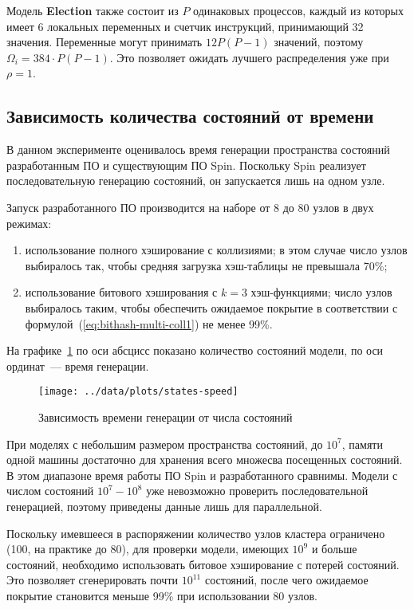 \documentclass[12pt,a4paper,fleqn]{article}
\newcommand{\Code}[1]{\textbf{\mbox{#1}}}
\begin{document}
Модель \Code{Election} также состоит из $P$ одинаковых процессов, каждый из которых имеет 6
локальных переменных и счетчик инструкций, принимающий 32 значения. Переменные могут принимать $12 P
(P-1)$ значений, поэтому $\Omega_i = 384\cdot P (P - 1)$. Это позволяет ожидать лучшего
распределения уже при $\rho = 1$.

\subsection{Зависимость количества состояний от времени}

В данном эксперименте оценивалось время генерации пространства состояний разработанным ПО и
существующим ПО Spin. Поскольку Spin реализует последовательную генерацию состояний, он запускается
лишь на одном узле.

Запуск разработанного ПО производится на наборе от 8 до 80 узлов в двух режимах:
\begin{enumerate}
\item использование полного хэширование с коллизиями; в этом случае число узлов выбиралось
  так, чтобы средняя загрузка хэш-таблицы не превышала 70\%;
\item использование битового хэширования с $k = 3$ хэш-функциями; число узлов выбиралось таким,
  чтобы обеспечить ожидаемое покрытие в соответствии с формулой~(\ref{eq:bithash-multi-coll1}) не
  менее 99\%.
\end{enumerate}

На графике~\ref{fig:states-speed} по оси абсцисс показано количество состояний модели, по
оси ординат~--- время генерации.

\begin{figure}[ht]
  \centering
  \texttt{[image: ../data/plots/states-speed]}
  \caption{Зависимость времени генерации от числа состояний}
  \label{fig:states-speed}
\end{figure}

При моделях с небольшим размером пространства состояний, до $10^7$, памяти одной машины
достаточно для хранения всего множесва посещенных состояний. В этом диапазоне время работы
ПО Spin и разработанного сравнимы. Модели с числом состояний $10^7-10^8$ уже невозможно
проверить последовательной генерацией, поэтому приведены данные лишь для
параллельной. 

Поскольку имевшееся в распоряжении количество узлов кластера ограничено (100, на практике
до 80), для проверки модели, имеющих $10^9$ и больше состояний, необходимо использовать
битовое хэширование с потерей состояний. Это позволяет сгенерировать почти $10^{11}$
состояний, после чего ожидаемое покрытие становится меньше 99\% при использовании 80
узлов.
\end{document}
